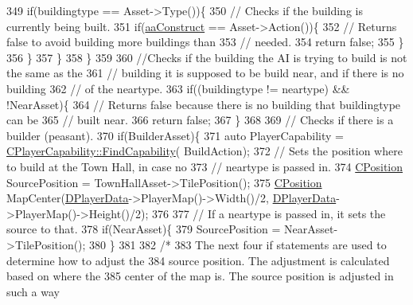 \begin{DoxyCode}
349             \textcolor{keywordflow}{if}(buildingtype == Asset->Type())\{
350                 \textcolor{comment}{// Checks if the building is currently being built.}
351                 \textcolor{keywordflow}{if}(\hyperlink{GameDataTypes_8h_ab47668e651a3032cfb9c40ea2d60d670a7ef6b863f66dd7dcc95a199cd758ae1d}{aaConstruct} == Asset->Action())\{
352                     \textcolor{comment}{// Returns false to avoid building more buildings than}
353                     \textcolor{comment}{// needed.}
354                     \textcolor{keywordflow}{return} \textcolor{keyword}{false};   
355                 \}
356             \}
357         \}
358     \}
359 
360     \textcolor{comment}{//Checks if the building the AI is trying to build is not the same as the }
361     \textcolor{comment}{// building it is supposed to be build near, and  if there is no building}
362     \textcolor{comment}{// of the neartype.}
363     \textcolor{keywordflow}{if}((buildingtype != neartype) && !NearAsset)\{
364         \textcolor{comment}{// Returns false because there is no building that buildingtype can be}
365         \textcolor{comment}{// built near. }
366         \textcolor{keywordflow}{return} \textcolor{keyword}{false};    
367     \}
368 
369     \textcolor{comment}{// Checks if there is a builder (peasant).}
370     \textcolor{keywordflow}{if}(BuilderAsset)\{
371         \textcolor{keyword}{auto} PlayerCapability = \hyperlink{classCPlayerCapability_a881ba4b87385d7cfe5cb6ced2d26f226}{CPlayerCapability::FindCapability}(
      BuildAction);
372         \textcolor{comment}{// Sets the position where to build at the Town Hall, in case no}
373         \textcolor{comment}{// neartype is passed in.}
374         \hyperlink{classCPosition}{CPosition} SourcePosition = TownHallAsset->TilePosition();
375         \hyperlink{classCPosition}{CPosition} MapCenter(\hyperlink{classCAIPlayer_a83b5113c8f7e80df54940b647c5ee2e6}{DPlayerData}->PlayerMap()->Width()/2, 
      \hyperlink{classCAIPlayer_a83b5113c8f7e80df54940b647c5ee2e6}{DPlayerData}->PlayerMap()->Height()/2);
376         
377         \textcolor{comment}{// If a neartype is passed in, it sets the source to that.}
378         \textcolor{keywordflow}{if}(NearAsset)\{
379             SourcePosition = NearAsset->TilePosition();
380         \}
381 
382         \textcolor{comment}{/*  }
383 \textcolor{comment}{            The next four if statements are used to determine how to adjust the}
384 \textcolor{comment}{            source position. The adjustment is calculated based on where the }
385 \textcolor{comment}{            center of the map is. The source position is adjusted in such a way }

\end{DoxyCode}
